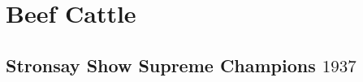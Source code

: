 \chapter{Beef Cattle}
\section[Supreme Champions]{Stronsay Show Supreme Champions $1937$}
\small

\normalsize
